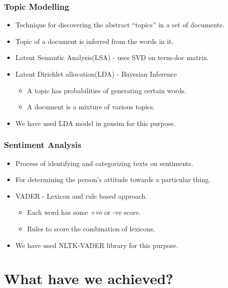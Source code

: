 \documentclass{beamer}
\begin{document}
\begin{frame}
	\frametitle{Topic Modelling}
	\begin{itemize}
		\item Technique for discovering the abstract ``topics'' in a set of documents.
		\item Topic of a document is inferred from the words in it.
		\item Latent Semantic Analysis(LSA) - uses SVD on term-doc matrix.
		\item Latent Dirichlet allocation(LDA) - Bayesian Inference
		\begin{itemize}
			\item A topic has probabilities of generating certain words.
			\item A document is a mixture of various topics.
		\end{itemize}
		\item We have used LDA model in gensim for this purpose.
	\end{itemize}
\end{frame}


\begin{frame}
	\frametitle{Sentiment Analysis}
	\begin{itemize}	
		\item Process of identifying and categorizing texts on sentiments.
		\item For determining the person's attitude towards a particular thing.
		\item VADER - Lexicon and rule based approach.
		\begin{itemize}
			\item Each word has some +ve or -ve score.
			\item Rules to score the combination of lexicons.
		\end{itemize}
		\item We have used NLTK-VADER library for this purpose.
	\end{itemize}
\end{frame}


\section{What have we achieved?}
\end{document}
